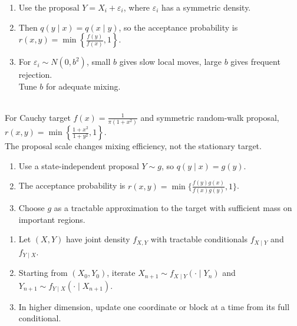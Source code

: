 \begin{method} \label{method:random-walk-metropolis} 
\begin{enumerate}[label=(\roman*)]
\setlength{\itemsep}{0pt}
\item Use the proposal $Y=X_i+\varepsilon_i$, where $\varepsilon_i$ has a symmetric density.
\item Then $q(y\mid x)=q(x\mid y)$, so the acceptance probability is $r(x,y)=\min\left\{\frac{f(y)}{f(x)},1\right\}$.
\item For $\varepsilon_i\sim N(0,b^2)$, small $b$ gives slow local moves, large $b$ gives frequent rejection.\\
Tune $b$ for adequate mixing.
\end{enumerate}
\end{method}

\begin{example} \label{ex:cauchy-random-walk-mh} \\
For Cauchy target $f(x)=\frac{1}{\pi(1+x^2)}$ and symmetric random-walk proposal, $r(x,y)=\min\left\{\frac{1+x^2}{1+y^2},1\right\}$.\\
The proposal scale changes mixing efficiency, not the stationary target.
\end{example}

\begin{method} \label{method:independence-metropolis} 
\begin{enumerate}[label=(\roman*)]
\setlength{\itemsep}{0pt}
\item Use a state-independent proposal $Y\sim g$, so $q(y\mid x)=g(y)$.
\item The acceptance probability is $r(x,y)=\min\{\frac{f(y)g(x)}{f(x)g(y)},1\}$.
\item Choose $g$ as a tractable approximation to the target with sufficient mass on important regions.
\end{enumerate}
\end{method}

\begin{method} \label{method:gibbs-sampling} 
\begin{enumerate}[label=(\roman*)]
\setlength{\itemsep}{0pt}
\item Let $(X,Y)$ have joint density $f_{X,Y}$ with tractable conditionals $f_{X\mid Y}$ and $f_{Y\mid X}$.
\item Starting from $(X_0,Y_0)$, iterate $X_{n+1}\sim f_{X\mid Y}(\cdot\mid Y_n)$ and $Y_{n+1}\sim f_{Y\mid X}(\cdot\mid X_{n+1})$.
\item In higher dimension, update one coordinate or block at a time from its full conditional.
\end{enumerate}
\end{method}

